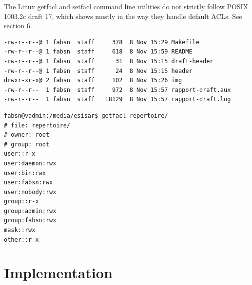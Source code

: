 The Linux getfacl and setfacl command line utilities do not strictly follow POSIX 1003.2c draft 17, which shows mostly in the way they handle default ACLs. See section 6.


\begin{verbatim}
-rw-r--r--@ 1 fabsn  staff     378  8 Nov 15:29 Makefile
-rw-r--r--@ 1 fabsn  staff     618  8 Nov 15:59 README
-rw-r--r--@ 1 fabsn  staff      31  8 Nov 15:15 draft-header
-rw-r--r--@ 1 fabsn  staff      24  8 Nov 15:15 header
drwxr-xr-x@ 2 fabsn  staff     102  8 Nov 15:26 img
-rw-r--r--  1 fabsn  staff     972  8 Nov 15:57 rapport-draft.aux
-rw-r--r--  1 fabsn  staff   18129  8 Nov 15:57 rapport-draft.log
\end{verbatim}

\begin{verbatim}
fabsn@vadmin:/media/esisar$ getfacl repertoire/
# file: repertoire/
# owner: root
# group: root
user::r-x
user:daemon:rwx
user:bin:rwx
user:fabsn:rwx
user:nobody:rwx
group::r-x
group:admin:rwx
group:fabsn:rwx
mask::rwx
other::r-x	
\end{verbatim}






\section{Implementation}

